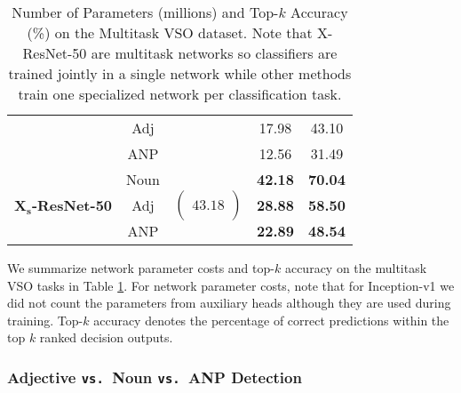 \documentclass{sig-alternate-05-2015}
\newcommand{\mb}{\mathbf}
\begin{document}
\begin{table}[t]
\begin{tabular}{lcccc}
    & Adj & & 17.98 & 43.10 \\
    & ANP & & 12.56 & 31.49 \\ \hline
    \multirow{3}{*}{\textbf{X$_{\mb s}$-ResNet-50}} & Noun & \multirow{3}{*}{$\begin{pmatrix} \, \\ 43.18 \\ \, \end{pmatrix}$} & \textbf{42.18} & \textbf{70.04} \\
    & Adj & & \textbf{28.88} & \textbf{58.50} \\
    & ANP & & \textbf{22.89} & \textbf{48.54} \\ \hline
  \end{tabular}
  \caption{Number of Parameters (millions) and Top-$k$ Accuracy (\%) on the Multitask VSO dataset. Note that X-ResNet-50 are multitask networks so classifiers are trained jointly in a single network while other methods train one specialized network per classification task.}
  \label{tab:mtvso_classifiers}
\end{table}

We summarize network parameter costs and top-$k$ accuracy on the multitask VSO tasks in Table \ref{tab:mtvso_classifiers}.
For network parameter costs, note that for Inception-v1 \cite{szegedy_2015} we did not count the parameters from auxiliary heads although they are used during training.
Top-$k$ accuracy denotes the percentage of correct predictions within the top $k$ ranked decision outputs.

\subsubsection{Adjective \texttt{vs.}~Noun \texttt{vs.}~ANP Detection}
\end{document}
